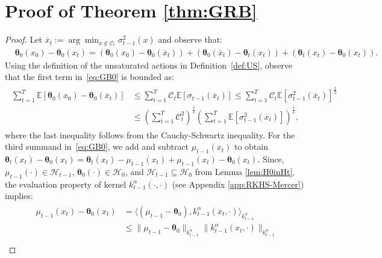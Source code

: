 \documentclass[final,12pt]{colt2026} %
\begin{document}
\section{Proof of Theorem \ref{thm:GRB}}\label{app:thm-GRB}
\begin{proof}
    Let $\overline{x}_t:= \arg\min_{x \notin \mathcal{C}_t} \sigma_{t-1}^2(x) $ and observe that:
    \begin{align}\label{eq:GB0}
        &\pmb \theta_0(x_0) -   \pmb \theta_0(x_t) = \left( \pmb \theta_0(x_0) -    \pmb \theta_0(\overline{x}_t) \right) + \left( \pmb \theta_0(\overline{x}_t) -   \pmb \theta_t(x_t) \right) + \left( \pmb \theta_t(x_t) -   \pmb \theta_0(x_t)\right) .
    \end{align}
    Using the definition of the unsaturated actions in Definition~\ref{def:US}, observe that the first term in~\eqref{eq:GB0} is bounded as:
    \begin{align}\label{eq:GB1}
    \begin{split}
        \sum_{t=1}^{T} \mathbb{E}\left[ \pmb \theta_0(x_0) -   \pmb \theta_0(\overline{x}_t) \right] &\leq  \sum_{t=1}^{T} {\mathcal{C}_t}\mathbb{E}[\sigma_{t-1}(\overline{x}_t)] \leq \sum_{t=1}^{T} \mathcal{C}_t \mathbb{E}[\sigma_{t-1}^2(\overline{x}_t)]^{\frac{1}{2}} \\
        &\leq \left(\sum_{t=1}^{T} \mathcal{C}_t^2 \right)^{\frac{1}{2}} \left(\sum_{t=1}^{T} \mathbb{E}[\sigma_{t-1}^2(\overline{x}_t)] \right)^{\frac{1}{2}},
    \end{split}
    \end{align} 
    where the last inequality follows from the Cauchy-Schwartz inequality. For the third summand in~\eqref{eq:GB0}, we add and subtract $\mu_{t-1}(x_t)$ to obtain
    \(
      \pmb \theta_t(x_t) -   \pmb \theta_0(x_t) = 
      \pmb \theta_t(x_t) - \mu_{t-1}(x_t)+ \mu_{t-1}(x_t)-  \pmb \theta_0(x_t).\)
    Since, $\mu_{t-1}(\cdot) \in \mathcal{H}_{t-1}$, $\pmb \theta_0(\cdot)\in \mathcal{H}_{0}$, and $\mathcal{H}_{t-1}\subseteq \mathcal{H}_0$ from Lemma \ref{lem:H0inHt}, the evaluation property of kernel $k_{t-1}^{\alpha}(\cdot, \cdot)$ (see Appendix \ref{app:RKHS-Mercer}) implies:
    \begin{align}\label{eq:GB1.5}
    \begin{split}
        \mu_{t-1}(x_t) -   \pmb \theta_0(x_t) &= \langle (\mu_{t-1}-\pmb \theta_0), k_{t-1}^{\alpha}(x_t,\cdot) \rangle_{k_{t-1}^{\alpha}}\\
        &\leq  \|\mu_{t-1}-\pmb \theta_0\|_{k_{t-1}^{\alpha}}  \| k_{t-1}^{\alpha}(x_t,\cdot)\|_{k_{t-1}^{\alpha}}\\

\end{split}
\end{align}
\end{proof}
\end{document}
